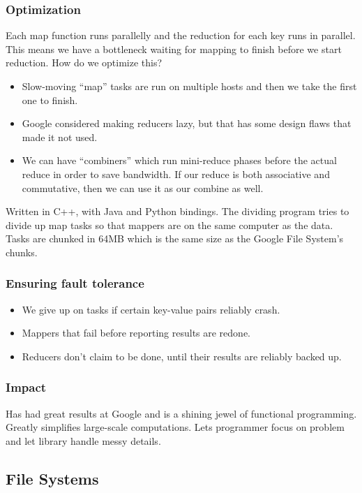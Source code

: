 \documentclass{scrartcl}
\begin{document}
\subsubsection*{Optimization}
Each map function runs parallelly and the reduction for each key runs in parallel.
This means we have a bottleneck waiting for mapping to finish before we start
reduction. How do we optimize this?
\begin{itemize}
\item Slow-moving ``map'' tasks are run on multiple hosts and then we take the
	first one to finish.
\item Google considered making reducers lazy, but that has some design flaws
	that made it not used.
\item We can have ``combiners'' which run mini-reduce phases before the actual
	reduce in order to save bandwidth. If our reduce is both associative and
	commutative, then we can use it as our combine as well.
\end{itemize}

Written in C++, with Java and Python bindings. The dividing program tries
to divide up map tasks so that mappers are on the same computer as the data.
Tasks are chunked in 64MB which is the same size as the Google File System's
chunks.

\subsubsection*{Ensuring fault tolerance}
\begin{itemize}
\item We give up on tasks if certain key-value pairs reliably crash.
\item Mappers that fail before reporting results are redone.
\item Reducers don't claim to be done, until their results are reliably backed
	up.
\end{itemize}
\subsubsection*{Impact}
Has had great results at Google and is a shining jewel of functional programming.
Greatly simplifies large-scale computations. Lets programmer focus on problem
and let library handle messy details.

\subsection*{File Systems}
\end{document}
